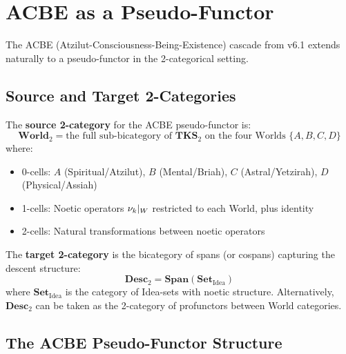 \section{ACBE as a Pseudo-Functor}
\label{sec:pseudo-functor-acbe}

The ACBE (Atzilut-Consciousness-Being-Existence) cascade from v6.1 extends
naturally to a pseudo-functor in the 2-categorical setting.

\subsection{Source and Target 2-Categories}

\begin{definition}
\label{def:acbe-source}
The \textbf{source 2-category} for the ACBE pseudo-functor is:
\[
  \mathbf{World}_2 = \text{the full sub-bicategory of } \mathbf{TKS}_2
  \text{ on the four Worlds } \{A, B, C, D\}
\]
where:
\begin{itemize}
  \item 0-cells: $A$ (Spiritual/Atzilut), $B$ (Mental/Briah), $C$ (Astral/Yetzirah), $D$ (Physical/Assiah)
  \item 1-cells: Noetic operators $\nu_{k}|_W$ restricted to each World, plus identity
  \item 2-cells: Natural transformations between noetic operators
\end{itemize}
\end{definition}

\begin{definition}
\label{def:acbe-target}
The \textbf{target 2-category} is the bicategory of spans (or cospans) capturing
the descent structure:
\[
  \mathbf{Desc}_2 = \mathbf{Span}(\mathbf{Set}_{\mathrm{Idea}})
\]
where $\mathbf{Set}_{\mathrm{Idea}}$ is the category of Idea-sets with noetic
structure. Alternatively, $\mathbf{Desc}_2$ can be taken as the 2-category
of profunctors between World categories.
\end{definition}

\subsection{The ACBE Pseudo-Functor Structure}

